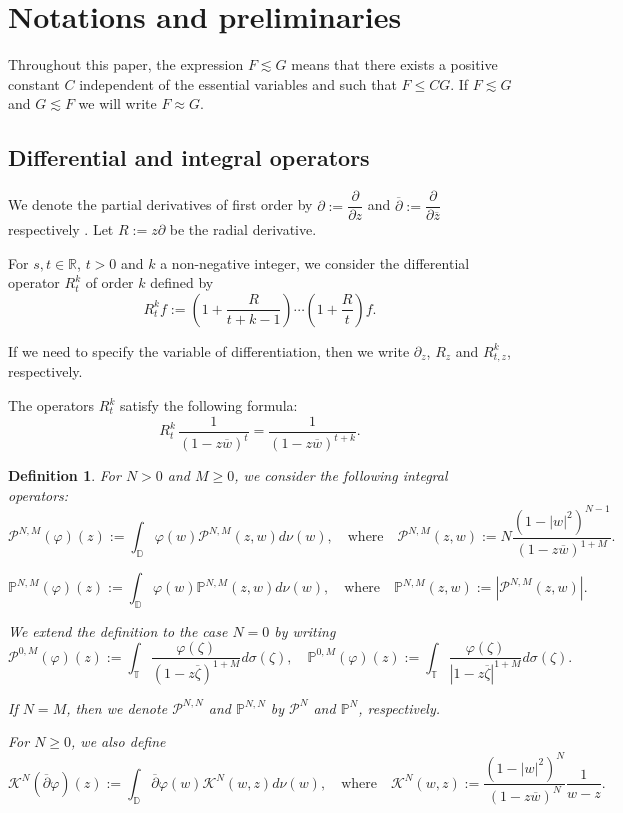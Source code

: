 \documentclass[12pt,twoside,leqno,final]{amsart}
\theoremstyle{plain}
\newtheorem{defn}[thm]{Definition}
\begin{document}
\section{Notations and preliminaries} \label{sec:notpre}

Throughout this paper, the expression $F\lesssim G$ means that there exists  
a positive constant $C$  independent of the essential variables and such that $F\le CG$. 
If $F\lesssim G$ and $G\lesssim F$ we will write $F\approx G$. 

\subsection{Differential and integral operators}\quad\par

We denote the partial derivatives of first order by 
${\partial}:=\dfrac{\partial}{{\partial} z}$ and $\overline{\partial}:=\dfrac{\partial}{{\partial} \overline z}$ respectively . Let $R:=z{\partial}$ be the radial derivative. 

For $s, t\in{{\mathbb R}}$, $t>0$ and $k$ a non-negative integer, we  consider 
the differential operator $R_t^k$ of order $k$ defined by  
$$
R_t^k f :=\left(1+\frac{R}{t+k-1}\right)\cdots\left(1+\frac{R}t\right)f.
$$

If we need to specify the variable of differentiation, then we write ${\partial}_z$, $R_z$ and $R^k_{t,z}$, respectively. 

The operators $R^k_{t}$ satisfy the following formula:
\begin{equation}\label{eqn:Rtk}
R_t^k\,\frac{1}{(1-z\overline w)^t}=\frac{1}{(1-z\overline w)^{t+k}}.
\end{equation}

\begin{defn}
For $N>0$ and $M\ge 0$, we consider the following integral operators:
$$
{{\mathcal P}}^{N,M}(\varphi)(z):=\int_{{\mathbb D}} \varphi(w) {{\mathcal P}}^{N,M}(z,w)d\nu(w),\quad\text{where}\quad  {{\mathcal P}}^{N,M}(z,w):=N\frac{(1-|w|^2)^{N-1}}{(1-z\overline w)^{1+M}}.
$$

$$
{\mathbb{P}}^{N,M}(\varphi)(z):=\int_{{\mathbb D}} \varphi(w){\mathbb{P}}^{N,M}(z,w)d\nu(w),\quad\text{where}\quad {\mathbb{P}}^{N,M}(z,w):=|{{\mathcal P}}^{N,M}(z,w)|.
$$

We extend the definition to the case $N=0$ by writing 
$$
{{\mathcal P}}^{0,M}(\varphi)(z):=\int_{{\mathbb T}} \frac{\varphi({\zeta})}{(1-z\overline {\zeta})^{1+M}}d\sigma({\zeta}),\quad {\mathbb{P}}^{0,M}(\varphi)(z):=\int_{{\mathbb T}} \frac{\varphi({\zeta})}{|1-z\overline {\zeta}|^{1+M}}d\sigma({\zeta}).
$$

If $N=M$, then we denote ${{\mathcal P}}^{N,N}$ and ${\mathbb{P}}^{N,N}$ by ${{\mathcal P}}^N$ and  ${\mathbb{P}}^N$, respectively. 

For $N\ge 0$, we also define 
$$
{{\mathcal K}}^N(\overline{\partial} \varphi)(z):=\int_{{\mathbb D}} \overline{\partial} \varphi(w){{\mathcal K}}^N(w,z)d\nu(w),
\quad\text{
where}\quad 
\displaystyle{
{{\mathcal K}}^N(w,z):=\frac{(1-|w|^2)^N}{(1-z\overline w)^N}\frac{1}{w-z}.
}$$
\end{defn}
\end{document}
